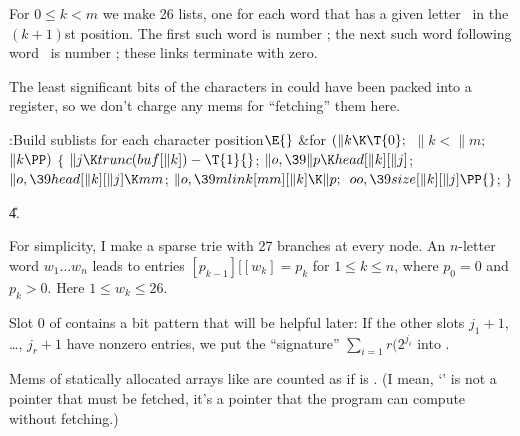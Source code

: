 For $0\le k<m$ we make 26 lists, one for each word that has a given
letter~
in the $(k+1)$st position. The first such word is  number
; the next such word following word~ is number
; these links terminate with zero.

The least significant bits of the characters in  could have been
packed into a register, so we don't charge any mems for ``fetching'' them here.

\Y\B\4:Build sublists for each character position\X${}\E{}$\6
\&{for} ${}(\|k\K\T{0};{}$ ${}\|k<\|m;{}$ ${}\|k\PP){}$\5
${}\{{}$\1\6
${}\|j\K\\{trunc}(\\{buf}[\|k])-\T{1}{}$;\6
${}\|o,\39\|p\K\\{head}[\|k][\|j]{}$;\6
${}\|o,\39\\{head}[\|k][\|j]\K\\{mm}{}$;\6
${}\|o,\39\\{mlink}[\\{mm}][\|k]\K\|p;{}$\6
${}\\{oo},\39\\{size}[\|k][\|j]\PP{}$;\6
\4${}\}{}$\2\par
\U4.\fi

For simplicity, I make a sparse trie with 27 branches at every node.
An $n$-letter word $w_1\ldots w_n$ leads to entries
$[p_{k-1}][[w_k]=p_k$ for $1\le k\le n$, where $p_0=0$ and
$p_k>0$.
Here $1\le w_k\le 26$.

Slot 0 of  contains a bit pattern that will be helpful later:
If the other slots $j_1+1$, \dots, $j_r+1$ have nonzero entries,
we put the ``signature'' $\sum_{i=1}r\bigl(2^{j_i}$ into .

Mems of statically allocated arrays like 
are counted as if  is .
(I mean,
`' is not a pointer that must be fetched, it's a pointer
that the program can compute without fetching.)

